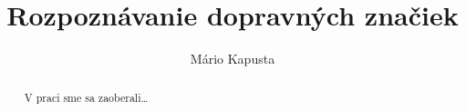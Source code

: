 \documentclass[12pt]{article}
\begin{document}
\title{Rozpoznávanie dopravných značiek}

\author{Mário Kapusta}
\maketitle
\thispagestyle{empty}
\clearpage
\tableofcontents
{}
\thispagestyle{empty}
\clearpage
\listoftables
\thispagestyle{empty}
\clearpage
\listoffigures
\thispagestyle{empty}
\clearpage
\begin{abstract}
V praci sme sa zaoberali\ldots
\end{abstract}
\clearpage

\end{document}
